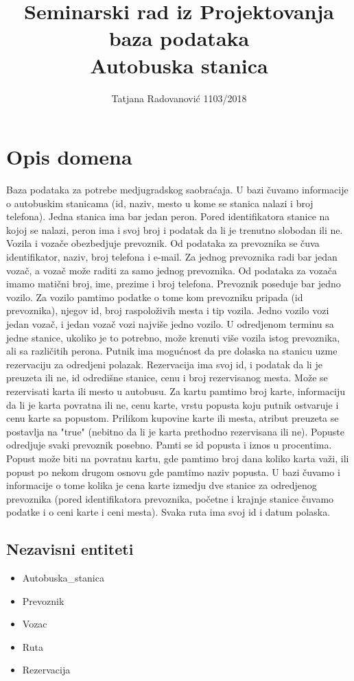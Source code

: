 \documentclass[12pt]{article}
\title{Seminarski rad iz Projektovanja baza podataka \\ Autobuska stanica}
\author{Tatjana Radovanovi\'c 1103/2018}
\begin{document}
\maketitle 

\newpage

\section{Opis domena}
Baza podataka za potrebe medjugradskog saobra\'caja. U bazi \v cuvamo informacije o autobuskim stanicama (id, naziv, mesto u kome se stanica nalazi i broj telefona). Jedna stanica ima bar jedan peron. Pored identifikatora stanice na kojoj se nalazi, peron ima i svoj broj i podatak da li je trenutno slobodan ili ne. Vozila i voza\v ce obezbedjuje prevoznik. Od podataka za prevoznika se \v cuva identifikator, naziv, broj telefona i e-mail. Za jednog prevoznika radi bar jedan voza\v c, a voza\v c mo\v ze raditi za samo jednog prevoznika. Od podataka za voza\v ca imamo mati\v cni broj, ime, prezime i broj telefona. Prevoznik poseduje bar jedno vozilo. Za vozilo pamtimo podatke o tome kom prevozniku pripada (id prevoznika), njegov id, broj raspolo\v zivih mesta i tip vozila. Jedno vozilo vozi jedan voza\v c, i jedan voza\v c vozi najvi\v se jedno vozilo. U odredjenom terminu sa jedne stanice, ukoliko je to potrebno, mo\v ze krenuti vi\v se vozila istog prevoznika, ali sa razli\v citih perona. Putnik ima mogu\'cnost da pre dolaska na stanicu uzme rezervaciju za odredjeni polazak. Rezervacija ima svoj id, i podatak da li je preuzeta ili ne, id odredi\v sne stanice, cenu i broj rezervisanog mesta. Mo\v ze se rezervisati karta ili mesto u autobusu. Za kartu pamtimo broj karte, informaciju da li je karta povratna ili ne, cenu karte, vrstu popusta koju putnik ostvaruje i cenu karte sa popustom. Prilikom kupovine karte ili mesta, atribut preuzeta se postavlja na "true" (nebitno da li je karta prethodno rezervisana ili ne). Popuste odredjuje svaki prevoznik posebno. Pamti se id popusta i iznos u procentima. Popust mo\v ze biti na povratnu kartu, gde pamtimo broj dana koliko karta va\v zi, ili popust po nekom drugom osnovu gde pamtimo naziv popusta. U bazi \v cuvamo i informacije o tome kolika je cena karte izmedju dve stanice za odredjenog prevoznika (pored identifikatora prevoznika, po\v cetne i krajnje stanice \v cuvamo podatke i o ceni karte i ceni mesta). 
Svaka ruta ima svoj id i datum polaska.

\subsection{Nezavisni entiteti}
\begin{itemize}
	\item Autobuska\_stanica
	\item Prevoznik
	\item Vozac
	\item Ruta
	\item Rezervacija
\end{itemize}
\end{document}
